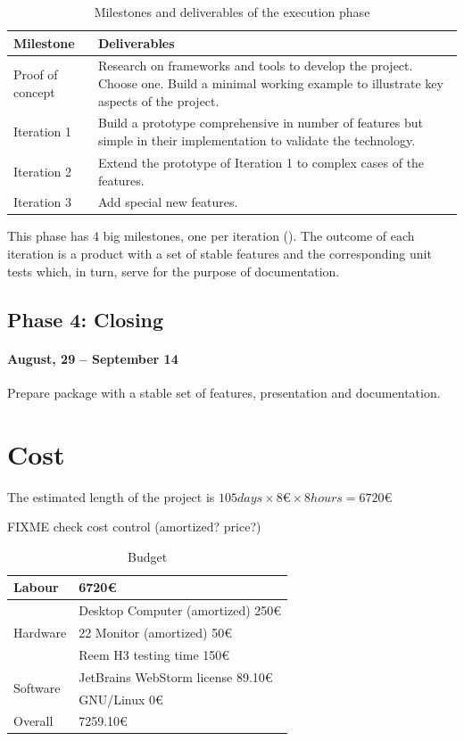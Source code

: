 \begin{table}[ht]
    \label{tab:milestones}
    \centering
    \begin{tabularx}{\linewidth}{| X | X |}
    \hline
    Milestone & Deliverables \\
    \hline
    Proof of concept & Research on frameworks and tools to develop the project. Choose one. Build a minimal working example to illustrate key aspects of the project. \\ \hline
    Iteration 1 & Build a prototype comprehensive in number of features but simple in their implementation to validate the technology. \\ \hline
    Iteration 2 & Extend the prototype of Iteration 1 to complex cases of the features. \\ \hline
    Iteration 3 & Add special new features. \\
    \hline
    \end{tabularx}
    \caption{Milestones and deliverables of the execution phase}
\end{table}

This phase has 4 big milestones, one per iteration (). 
The outcome of each iteration is a product with a set of stable features and the corresponding unit tests which, in turn, serve for the purpose of documentation.

\subsection{Phase 4: Closing}
\paragraph{August, 29 -- September 14}
Prepare package with a stable set of features, presentation and documentation.

\section{Cost}
\label{sec:budget}
The estimated length of the project is $105 days \times 8 \euro{} \times 8 hours = 6720 \euro{} $

FIXME check cost control (amortized? price?)

\begin{table}[ht]
    \centering
    \caption{Budget}
    \label{tab:budget}
    \begin{tabular}{| l | l |}
    \hline
    Labour & 6720\euro{} \\ \hline
    \multirow{3}{*}{Hardware} 
        & Desktop Computer (amortized) 250\euro{} \\ %
        & 22 Monitor (amortized) 50\euro{} \\
        & Reem H3 testing time 150\euro{} \\ \hline   
    \multirow{2}{*}{Software}
        & JetBrains WebStorm license 89.10\euro{} \\ %
        & GNU/Linux 0\euro{} \\ \hline
     Overall & 7259.10\euro{} \\ 
     \hline
    \end{tabular}
\end{table}

